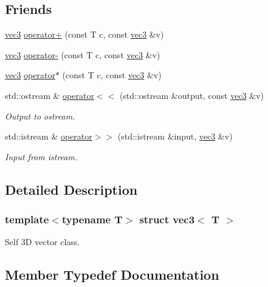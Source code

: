 \subsection*{Friends}
\begin{DoxyCompactItemize}
\item 
\mbox{\hyperlink{structvec3}{vec3}} \mbox{\hyperlink{structvec3_a04165a00cae4ce5d2f5e142cc177a720}{operator+}} (const T c, const \mbox{\hyperlink{structvec3}{vec3}} \&v)
\item 
\mbox{\hyperlink{structvec3}{vec3}} \mbox{\hyperlink{structvec3_a6252e85a538cca25b99107166be778b1}{operator-\/}} (const T c, const \mbox{\hyperlink{structvec3}{vec3}} \&v)
\item 
\mbox{\hyperlink{structvec3}{vec3}} \mbox{\hyperlink{structvec3_a4f0b2685679a321b6c43a7406719c3a5}{operator$\ast$}} (const T c, const \mbox{\hyperlink{structvec3}{vec3}} \&v)
\item 
std\+::ostream \& \mbox{\hyperlink{structvec3_af5e1bcad9d3d484d6f4e6b3f8949f5cf}{operator$<$$<$}} (std\+::ostream \&output, const \mbox{\hyperlink{structvec3}{vec3}} \&v)
\begin{DoxyCompactList}\small\item\em Output to ostream. \end{DoxyCompactList}\item 
std\+::istream \& \mbox{\hyperlink{structvec3_a72f92578884bd68e0747871acd8545fd}{operator$>$$>$}} (std\+::istream \&input, \mbox{\hyperlink{structvec3}{vec3}} \&v)
\begin{DoxyCompactList}\small\item\em Input from istream. \end{DoxyCompactList}\end{DoxyCompactItemize}


\subsection{Detailed Description}
\subsubsection*{template$<$typename T$>$\newline
struct vec3$<$ T $>$}

Self 3D vector class. 

\subsection{Member Typedef Documentation}
\mbox{\label{structvec3_a20de853e5a37c5197acba3e136a66735}} 

